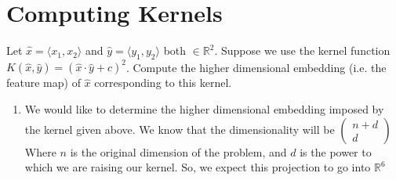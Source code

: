 \documentclass[11pt]{article}
\begin{document}
    \section{Computing Kernels}
    Let $\hat{x} = \langle x_1, x_2 \rangle$ and $\hat{y} = \langle y_1, y_2 \rangle$ 
    both $\in \mathbb{R}^2$. Suppose we use the kernel function
    $K(\hat{x},\hat{y})=(\hat{x} \cdot \hat{y} + c)^2$. Compute the higher
    dimensional embedding (i.e. the feature map) of $\hat{x}$ corresponding to
    this kernel.

    \begin{enumerate}
        \item   We would like to determine the higher dimensional embedding
            imposed by the kernel given above. We know that the dimensionality
            will be {\footnotesize $\left( \begin{array}{c} n + d \\ d \end{array} \right)$} 
            Where $n$ is the original dimension of the 
            problem, and $d$ is the power to which we are raising our kernel. 
            So, we expect this projection to go into $\mathbb{R}^6$


\end{enumerate}
\end{document}
